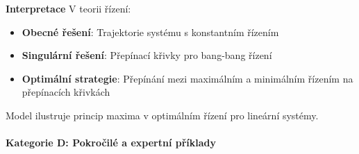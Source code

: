 \begin{example}
\vspace{1.5\baselineskip}

\noindent\textbf{Interpretace}
V teorii řízení:
\begin{itemize}
\item \textbf{Obecné řešení}: Trajektorie systému s konstantním řízením
\item \textbf{Singulární řešení}: Přepínací křivky pro bang-bang řízení
\item \textbf{Optimální strategie}: Přepínání mezi maximálním a minimálním řízením na přepínacích křivkách
\end{itemize}
Model ilustruje princip maxima v optimálním řízení pro lineární systémy.

\end{example}

\paragraph*{Kategorie D: Pokročilé a expertní příklady}

